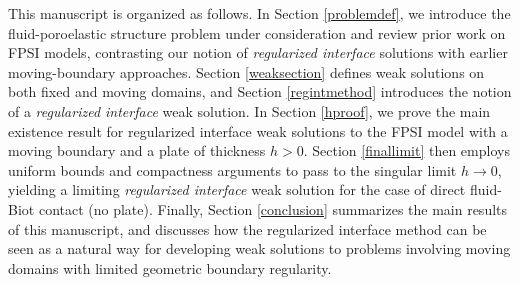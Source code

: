 \documentclass[11pt]{article}
\theoremstyle{definition}
\begin{document}
This manuscript is organized as follows. In Section \ref{problemdef}, we introduce the fluid-poroelastic structure problem under consideration and review prior work on FPSI models, contrasting our notion of \textit{regularized interface} solutions with earlier moving-boundary approaches. Section \ref{weaksection} defines weak solutions on both fixed and moving domains, and Section \ref{regintmethod} introduces the notion of a \textit{regularized interface} weak solution. In Section \ref{hproof}, we prove the main existence result for regularized interface weak solutions to the FPSI model with a moving boundary and a plate of thickness $h>0$. Section \ref{finallimit} then employs uniform bounds and compactness arguments to pass to the singular limit $h\to 0$, yielding a limiting \textit{regularized interface} weak solution for the case of direct fluid-Biot contact (no plate). Finally, Section \ref{conclusion} summarizes the main results of this manuscript, and discusses 
how the regularized interface method can be seen as a natural way for developing weak solutions to problems involving moving domains with limited geometric boundary regularity.
\end{document}
